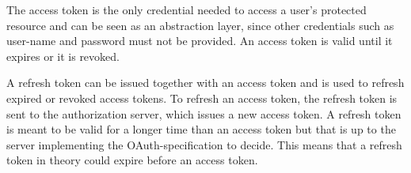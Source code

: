 \documentclass{cslthse-msc}
\begin{document}
The access token is the only credential needed to access a user's protected resource and can be seen as an abstraction layer, since other credentials such as user-name and password must not be provided. An access token is valid until it expires or it is revoked.  

A refresh token can be issued together with an access token and is used to refresh expired or revoked access tokens. To refresh an access token, the refresh token is sent to the authorization server, which issues a new access token. A refresh token is meant to be valid for a longer time than an access token but that is up to the server implementing the OAuth-specification to decide. This means that a refresh token in theory could expire before an access token. 

\end{document}
